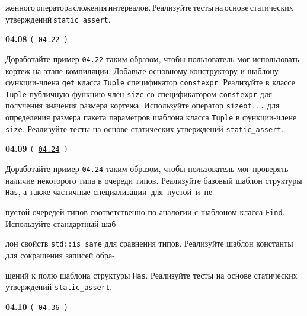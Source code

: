 \documentclass[a4paper,12pt]{article}
\begin{document}
женного\,оператора\,сложения\,интервалов.\,Реализуйте\,тесты\,на\,основе\,статических\,утверждений\,\lstinline{static_assert}.

\bigskip

{\large \textbf{04.08} \texttt{(\,\href{https://github.com/i-s-m-mipt/Education/blob/master/projects/examples/source/04.22.cpp}{04.22}\,)}}

\bigskip

Доработайте пример \href{https://github.com/i-s-m-mipt/Education/blob/master/projects/examples/source/04.22.cpp}{\texttt{04.22}} таким образом, чтобы пользователь мог использовать кортеж на этапе компиляции. Добавьте основному конструктору и шаблону функции-члена \lstinline{get} класса \lstinline{Tuple} спецификатор \lstinline{constexpr}. Реализуйте в классе \lstinline{Tuple} публичную функцию-член \lstinline{size} со спецификатором \lstinline{constexpr} для получения значения размера кортежа. Используйте оператор \lstinline{sizeof...} для определения размера пакета параметров шаблона класса \lstinline{Tuple} в функции-члене \lstinline{size}. Реализуйте тесты на основе статических утверждений \lstinline{static_assert}.

\bigskip

{\large \textbf{04.09} \texttt{(\,\href{https://github.com/i-s-m-mipt/Education/blob/master/projects/examples/source/04.24.cpp}{04.24}\,)}}

\bigskip

Доработайте пример \href{https://github.com/i-s-m-mipt/Education/blob/master/projects/examples/source/04.24.cpp}{\texttt{04.24}} таким образом, чтобы пользователь мог проверять наличие некоторого типа в очереди типов. Реализуйте базовый шаблон структуры \lstinline{Has}, а также частичные специализации~для~пустой~и~не-

пустой очередей типов соответственно по аналогии с шаблоном класса \lstinline{Find}. Используйте стандартный шаб- 

лон свойств \lstinline{std::is_same} для сравнения типов. Реализуйте шаблон константы для сокращения записей обра- 

щений к полю шаблона структуры \lstinline{Has}. Реализуйте тесты на основе статических утверждений \lstinline{static_assert}.

\bigskip

{\large \textbf{04.10} \texttt{(\,\href{https://github.com/i-s-m-mipt/Education/blob/master/projects/examples/source/04.36.cpp}{04.36}\,)}}

\bigskip
\end{document}
